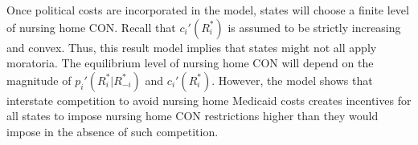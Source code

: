 \documentclass[../Main.tex]{subfiles}
\begin{document}
Once political costs are incorporated in the model, states will choose a finite level of nursing home CON. Recall that $c_i'(R_i^*)$ is assumed to be strictly increasing and convex. Thus, this result model implies that states might not all apply moratoria. The equilibrium level of nursing home CON will depend on the magnitude of $p_i'(R_i^*|R_{-i}^*)$ and $c_i'(R_i^*)$. However, the model shows that interstate competition to avoid nursing home Medicaid costs creates incentives for all states to impose nursing home CON restrictions higher than they would impose in the absence of such competition.
\end{document}
